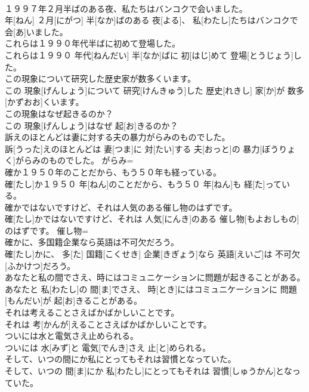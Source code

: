 \documentclass[8pt]{extreport}
\begin{document}
\begin{CJK}{UTF8}{min}
\\	１９９７年２月半ばのある夜、私たちはバンコクで会いました。	
\\	年[ねん] ２月[にがつ] 半[なか]ばのある 夜[よる]、 私[わたし]たちはバンコクで 会[あ]いました。	
\\	これらは１９９０年代半ばに初めて登場した。	
\\	これらは１９９０ 年代[ねんだい] 半[なか]ばに 初[はじ]めて 登場[とうじょう]した。	
\\	この現象について研究した歴史家が数多くいます。	
\\	この 現象[げんしょう]について 研究[けんきゅう]した 歴史[れきし] 家[か]が 数多[かずおお]くいます。	
\\	この現象はなぜ起きるのか？	
\\	この 現象[げんしょう]はなぜ 起[お]きるのか？	
\\	訴えのほとんどは妻に対する夫の暴力がらみのものでした。	
\\	訴[うった]えのほとんどは 妻[つま]に 対[たい]する 夫[おっと]の 暴力[ぼうりょく]がらみのものでした。	がらみ= 
\\	確か１９５０年のことだから、もう５０年も経っている。	
\\	確[たし]か１９５０ 年[ねん]のことだから、もう５０ 年[ねん]も 経[た]っている。	
\\	確かではないですけど、それは人気のある催し物のはずです。	
\\	確[たし]かではないですけど、それは 人気[にんき]のある 催し物[もよおしもの]のはずです。	催し物= 
\\	確かに、多国籍企業なら英語は不可欠だろう。	
\\	確[たし]かに、 多[た] 国籍[こくせき] 企業[きぎょう]なら 英語[えいご]は 不可欠[ふかけつ]だろう。	
\\	あなたと私の間でさえ、時にはコミュニケーションに問題が起きることがある。	
\\	あなたと 私[わたし]の 間[ま]でさえ、 時[とき]にはコミュニケーションに 問題[もんだい]が 起[お]きることがある。	
\\	それは考えることさえばかばかしいことです。	
\\	それは 考[かんが]えることさえばかばかしいことです。	
\\	ついには水と電気さえ止められる。	
\\	ついには 水[みず]と 電気[でんき]さえ 止[と]められる。	
\\	そして、いつの間にか私にとってもそれは習慣となっていた。	
\\	そして、いつの 間[ま]にか 私[わたし]にとってもそれは 習慣[しゅうかん]となっていた。	

\end{CJK}
\end{document}
